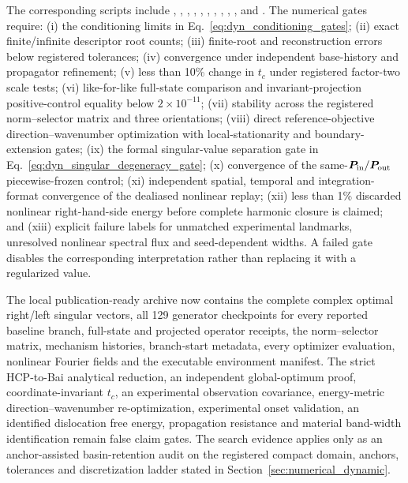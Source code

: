 The corresponding scripts include , , , , , , , , , ,  and . The numerical gates require: (i) the conditioning limits in Eq.~\eqref{eq:dyn_conditioning_gates}; (ii) exact finite/infinite descriptor root counts; (iii) finite-root and reconstruction errors below registered tolerances; (iv) convergence under independent base-history and propagator refinement; (v) less than 10\% change in $t_c$ under registered factor-two scale tests; (vi) like-for-like full-state comparison and invariant-projection positive-control equality below $2\times10^{-11}$; (vii) stability across the registered norm--selector matrix and three orientations; (viii) direct reference-objective direction--wavenumber optimization with local-stationarity and boundary-extension gates; (ix) the formal singular-value separation gate in Eq.~\eqref{eq:dyn_singular_degeneracy_gate}; (x) convergence of the same-$\boldsymbol P_{\rm in}/\boldsymbol P_{\rm out}$ piecewise-frozen control; (xi) independent spatial, temporal and integration-format convergence of the dealiased nonlinear replay; (xii) less than 1\% discarded nonlinear right-hand-side energy before complete harmonic closure is claimed; and (xiii) explicit failure labels for unmatched experimental landmarks, unresolved nonlinear spectral flux and seed-dependent widths. A failed gate disables the corresponding interpretation rather than replacing it with a regularized value.

The local publication-ready archive now contains the complete complex optimal right/left singular vectors, all 129 generator checkpoints for every reported baseline branch, full-state and projected operator receipts, the norm--selector matrix, mechanism histories, branch-start metadata, every optimizer evaluation, nonlinear Fourier fields and the executable environment manifest. The strict HCP-to-Bai analytical reduction, an independent global-optimum proof, coordinate-invariant $t_c$, an experimental observation covariance, energy-metric direction--wavenumber re-optimization, experimental onset validation, an identified dislocation free energy, propagation resistance and material band-width identification remain false claim gates. The search evidence applies only as an anchor-assisted basin-retention audit on the registered compact domain, anchors, tolerances and discretization ladder stated in Section~\ref{sec:numerical_dynamic}.
